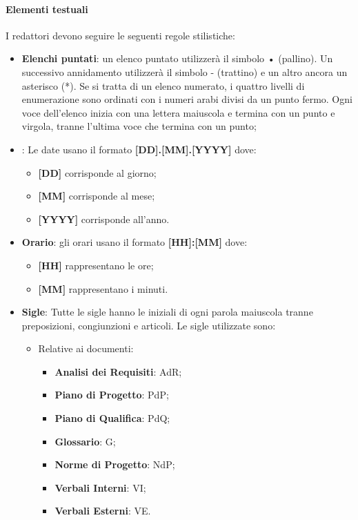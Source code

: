 \paragraph{Elementi testuali}
I redattori devono seguire le seguenti regole stilistiche:
\begin{itemize}
\item \textbf{Elenchi puntati}: un elenco puntato utilizzerà il simbolo • (pallino). Un successivo annidamento utilizzerà il simbolo - (trattino) e un altro ancora un asterisco (*). Se si tratta di un elenco numerato, i quattro livelli di enumerazione sono ordinati con i numeri arabi divisi da un punto fermo. Ogni voce dell’elenco inizia con una lettera maiuscola e termina con un punto e virgola, tranne l'ultima voce che termina con un punto;

\item {}: Le date usano il formato \textbf{[DD].[MM].[YYYY]} dove:
    \begin{itemize}
    \item \textbf{[DD]} corrisponde al giorno;
    \item \textbf{[MM]} corrisponde al mese;
    \item \textbf{[YYYY]} corrisponde all’anno.
    \end{itemize}

\item \textbf{Orario}: gli orari usano il formato \textbf{[HH]:[MM]} dove:
    \begin{itemize}
    \item \textbf{[HH]} rappresentano le ore;
    \item \textbf{[MM]} rappresentano i minuti.
    \end{itemize}

\item \textbf{Sigle}: Tutte le sigle hanno le iniziali di ogni parola maiuscola tranne preposizioni, congiunzioni e articoli. Le sigle utilizzate sono:
    \begin{itemize}
    \item Relative ai documenti:
        \begin{itemize}
        \item \textbf{Analisi dei Requisiti}: AdR;
        \item \textbf{Piano di Progetto}: PdP;
        \item \textbf{Piano di Qualifica}: PdQ;
        \item \textbf{Glossario}: G;
        \item \textbf{Norme di Progetto}: NdP;
        \item \textbf{Verbali Interni}: VI;
        \item \textbf{Verbali Esterni}: VE.
        \end{itemize}
    

\end{itemize}
\end{itemize}

